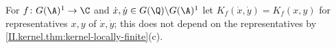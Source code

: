 For $f\colon G(\A)^1\to\C$ and $\dot x,\dot y\in G(\Q)\backslash G(\A)^1$ let $K_f(\dot x,\dot y)=K_f(x,y)$ for representatives $x,y$ of $\dot x,\dot y$; this does not depend on the representatives by \cref{II.kernel.thm:kernel-locally-finite}(c).
